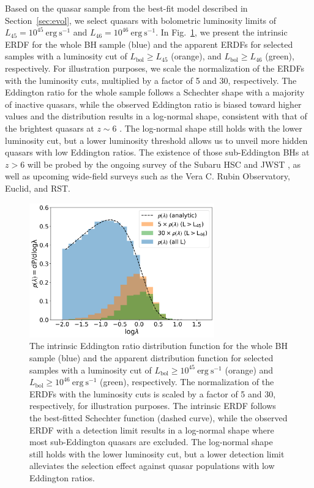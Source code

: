 \documentclass[twocolumn, twocolappendix]{aastex63}
\newcommand{\Lbol}{L_\mathrm{bol}}
\begin{document}
\begin{CJK*}{UTF8}{gbsn}
Based on the quasar sample from the best-fit model described in Section~\ref{sec:evol},
we select quasars with bolometric luminosity limits of $L_{45}=10^{45}~\mathrm{erg~s^{-1}}$ and $L_{46}=10^{46}~\mathrm{erg~s^{-1}}$.
In Fig.~\ref{fig:lhist}, we present the intrinsic ERDF for the whole BH sample (blue)
and the apparent ERDFs for selected samples with a luminosity cut of $\Lbol \geq L_{45}$ (orange),
and $\Lbol \geq L_{46}$ (green), respectively.
For illustration purposes, we scale the normalization of the ERDFs with the luminosity cuts, multiplied by a factor of 5 and 30, respectively.
The Eddington ratio for the whole sample follows a Schechter shape with a majority of inactive quasars,
while the observed Eddington ratio is biased toward higher values and the distribution results in a log-normal shape,
consistent with that of the brightest quasars at $z\sim 6$ \citep[e.g.,][]{2010AJ....140..546W,2019ApJ...873...35S,2021ApJ...923..262Y,2022arXiv220705113F}.
The log-normal shape still holds with the lower luminosity cut, but a lower luminosity threshold allows us to unveil more hidden quasars with low Eddington ratios.
The existence of those sub-Eddington BHs at $z>6$ will be probed by the ongoing survey of the Subaru HSC and JWST
\citep{2019ApJ...880...77O,2021jwst.prop.1967O}, as well as upcoming wide-field surveys such as the Vera C. Rubin Observatory, Euclid, and RST.


\begin{figure}
\centering
\includegraphics[width=80mm]{l_hist.png}
\caption{
The intrinsic Eddington ratio distribution function for the whole BH sample (blue) and the apparent distribution function for selected samples with
a luminosity cut of $\Lbol \geq 10^{45}~\mathrm{erg~s^{-1}}$ (orange) and $\Lbol \geq 10^{46}~\mathrm{erg~s^{-1}}$ (green), respectively.
The normalization of the ERDFs with the luminosity cuts is scaled by a factor of 5 and 30, respectively, for illustration purposes.
The intrinsic ERDF follows the best-fitted Schechter function (dashed curve),
while the observed ERDF with a detection limit results in a log-normal shape where most sub-Eddington quasars are excluded.
The log-normal shape still holds with the lower luminosity cut, but a lower detection limit alleviates the selection effect against quasar populations with low Eddington ratios.
}
\label{fig:lhist}
\end{figure}
  



\end{CJK*}
\end{document}

